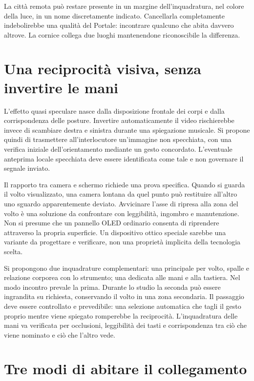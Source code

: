 La città remota può restare presente in un margine dell'inquadratura,
nel colore della luce, in un nome discretamente indicato. Cancellarla
completamente indebolirebbe una qualità del Portale: incontrare qualcuno
che abita davvero altrove. La cornice collega due luoghi mantenendone
riconoscibile la differenza.

\section{Una reciprocità visiva, senza invertire le mani}

L'effetto quasi speculare nasce dalla disposizione frontale dei corpi e
dalla corrispondenza delle posture. Invertire automaticamente il video
rischierebbe invece di scambiare destra e sinistra durante una spiegazione
musicale. Si propone quindi di trasmettere all'interlocutore un'immagine
non specchiata, con una verifica iniziale dell'orientamento mediante un
gesto concordato. L'eventuale anteprima locale specchiata deve essere
identificata come tale e non governare il segnale inviato.

Il rapporto tra camera e schermo richiede una prova specifica. Quando si
guarda il volto visualizzato, una camera lontana da quel punto può
restituire all'altro uno sguardo apparentemente deviato. Avvicinare
l'asse di ripresa alla zona del volto è una soluzione da confrontare
con leggibilità, ingombro e manutenzione. Non si presume che un pannello
OLED ordinario consenta di riprendere attraverso la propria superficie.
Un dispositivo ottico speciale sarebbe una variante da progettare e
verificare, non una proprietà implicita della tecnologia scelta.

Si propongono due inquadrature complementari: una principale per volto,
spalle e relazione corporea con lo strumento; una dedicata alle mani e
alla tastiera. Nel modo incontro prevale la prima. Durante lo studio la
seconda può essere ingrandita su richiesta, conservando il volto in una
zona secondaria. Il passaggio deve essere controllato e prevedibile:
una selezione automatica che tagli il gesto proprio mentre viene spiegato
romperebbe la reciprocità. L'inquadratura delle mani va verificata per
occlusioni, leggibilità dei tasti e corrispondenza tra ciò che viene
nominato e ciò che l'altro vede.

\section{Tre modi di abitare il collegamento}

